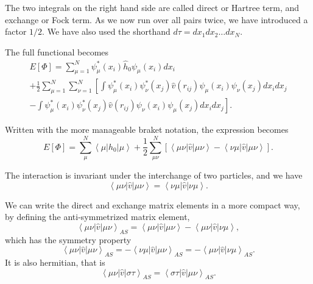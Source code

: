 	The two integrals on the right hand side are called direct or Hartree term, and exchange or Fock term. As we now run over all pairs twice, we have introduced a factor $1/2$. We have also used the shorthand $d\tau = dx_1 dx_2 \dots dx_N$.

	The full functional becomes 
	\begin{multline*}
		E\left[\Phi\right]=\sum_{\mu=1}^{N}\psi_{\mu}^{*}\left(x_{i}\right)\hat{h}_{0}\psi_{\mu}\left(x_{i}\right)dx_{i}\\
		+\frac{1}{2}\sum_{\mu=1}^{N}\sum_{\nu=1}^{N}\left[\int\psi_{\mu}^{*}\left(x_{i}\right)\psi_{\nu}^{*}\left(x_{j}\right)\hat{v}\left(r_{ij}\right)\psi_{\mu}\left(x_{i}\right)\psi_{\nu}\left(x_{j}\right)dx_{i}dx_{j}\right.\\
		\left.-\int\psi_{\mu}^{*}\left(x_{i}\right)\psi_{\nu}^{*}\left(x_{j}\right)\hat{v}\left(r_{ij}\right)\psi_{\nu}\left(x_{i}\right)\psi_{\mu}\left(x_{j}\right)dx_{i}dx_{j}\right].
	\end{multline*}

	Written with the more manageable braket notation, the expression becomes
	\begin{equation} \label{HFenergy_braket}
	E\left[\Phi\right]=\sum_{\mu}^{N}\left\langle \mu\right|\hat{h}_{0}\left|\mu\right\rangle +\frac{1}{2}\sum_{\mu\nu}^{N}\left[\left\langle \mu\nu\right|\hat{v}\left|\mu\nu\right\rangle -\left\langle \nu\mu\right|\hat{v}\left|\mu\nu\right\rangle \right].
	\end{equation}

	The interaction is invariant under the interchange of two particles, and we have
	\[
	\left\langle \mu\nu\right|\hat{v}\left|\mu\nu\right\rangle =\left\langle \nu\mu\right|\hat{v}\left|\nu\mu\right\rangle .
	\]

	We can write the direct and exchange matrix elements in a more compact way, by defining the anti-symmetrized matrix element,
	\[
	\left\langle \mu\nu\right|\hat{v}\left|\mu\nu\right\rangle _{AS}=\left\langle \mu\nu\right|\hat{v}\left|\mu\nu\right\rangle -\left\langle \mu\nu\right|\hat{v}\left|\nu\mu\right\rangle ,
	\]
	which has the symmetry property
	\[
	\left\langle \mu\nu\right|\hat{v}\left|\mu\nu\right\rangle _{AS}=-\left\langle \nu\mu\right|\hat{v}\left|\mu\nu\right\rangle _{AS}=-\left\langle \mu\nu\right|\hat{v}\left|\nu\mu\right\rangle _{AS}.
	\]
	It is also hermitian, that is
	\[
	\left\langle \mu\nu\right|\hat{v}\left|\sigma\tau\right\rangle _{AS}=\left\langle \sigma\tau\right|\hat{v}\left|\mu\nu\right\rangle _{AS}.
	\]

